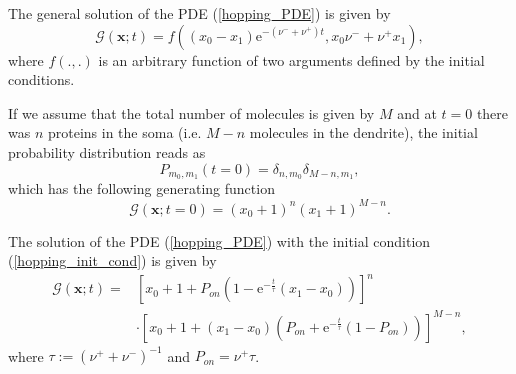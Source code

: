 \documentclass[a4paper, 11pt]{article}
\begin{document}
The general solution of the PDE (\ref{hopping_PDE}) is given by
\begin{equation*}
  \mathcal G(\mathbf x; t) = f\left((x_0-x_1)\mathrm e^{-(\nu^-+\nu^+)t}, x_0\nu^-+\nu^+x_1\right),
\end{equation*}
where $f(.,.)$ is an arbitrary function of two arguments defined by the initial conditions.

If we assume that the total number of molecules is given by $M$ and at $t=0$ there was $n$ proteins in the soma (i.e. $M-n$ molecules in the dendrite), the initial probability distribution reads as
\begin{equation*}
  P_{m_0, m_1}(t=0) = \delta_{n,m_0}\delta_{M-n,m_1},
\end{equation*}
which has the following generating function
\begin{equation}\label{hopping_init_cond}
  \mathcal G(\mathbf x; t=0) = (x_0+1)^n(x_1+1)^{M-n}.
\end{equation}

The solution of the PDE (\ref{hopping_PDE}) with the initial condition (\ref{hopping_init_cond}) is given by
\begin{equation*}
  \begin{split}
    \mathcal G(\mathbf x; t) = &\left[x_0+1+P_{on}\left(1-\mathrm e^{-\frac{t}{\tau}}(x_1-x_0)\right)\right]^n\\
    &\cdot\left[x_0+1+(x_1-x_0)\left(P_{on}+\mathrm e^{-\frac{t}{\tau}}(1-P_{on})\right)\right]^{M-n},
  \end{split}
\end{equation*}
where $\tau := (\nu^++\nu^-)^{-1}$ and $P_{on} = \nu^+\tau$.
\end{document}

